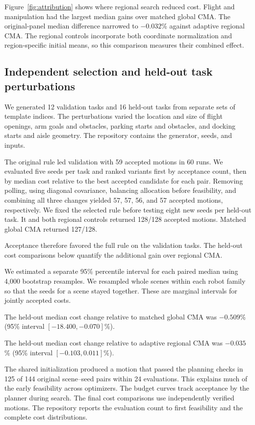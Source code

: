 

Figure~\ref{fig:attribution} shows where regional search reduced cost. Flight and manipulation had the largest median gains over matched global CMA. The original-panel median difference narrowed to $-0.032$\% against adaptive regional CMA. The regional controls incorporate both coordinate normalization and region-specific initial means, so this comparison measures their combined effect.

\subsection{Independent selection and held-out task perturbations}

We generated 12 validation tasks and 16 held-out tasks from separate sets of template indices. The perturbations varied the location and size of flight openings, arm goals and obstacles, parking starts and obstacles, and docking starts and aisle geometry. The repository contains the generator, seeds, and inputs.

The original rule led validation with 59 accepted motions in 60 runs. We evaluated five seeds per task and ranked variants first by acceptance count, then by median cost relative to the best accepted candidate for each pair. Removing polling, using diagonal covariance, balancing allocation before feasibility, and combining all three changes yielded 57, 57, 56, and 57 accepted motions, respectively. We fixed the selected rule before testing eight new seeds per held-out task. It and both regional controls returned 128/128 accepted motions. Matched global CMA returned 127/128.

Acceptance therefore favored the full rule on the validation tasks. The held-out cost comparisons below quantify the additional gain over regional CMA.

We estimated a separate 95\% percentile interval for each paired median using 4,000 bootstrap resamples. We resampled whole scenes within each robot family so that the seeds for a scene stayed together. These are marginal intervals for jointly accepted costs.

The held-out median cost change relative to matched global CMA was $-0.509$\% (95\% interval $[-18.400,-0.070]$\%).

The held-out median cost change relative to adaptive regional CMA was $-0.035$\% (95\% interval $[-0.103,0.011]$\%).

The shared initialization produced a motion that passed the planning checks in 125 of 144 original scene--seed pairs within 24 evaluations. This explains much of the early feasibility across optimizers. The budget curves track acceptance by the planner during search. The final cost comparisons use independently verified motions. The repository reports the evaluation count to first feasibility and the complete cost distributions.

